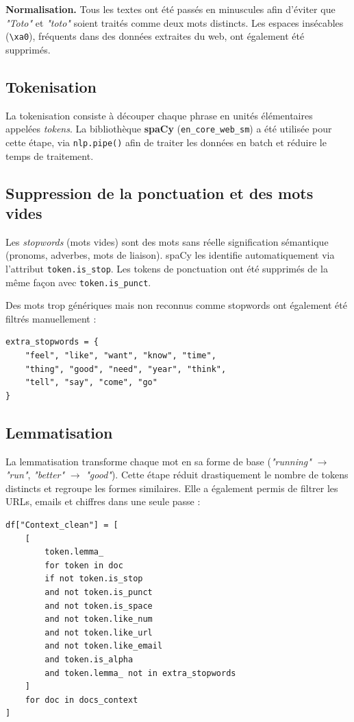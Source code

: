 \documentclass[12pt,a4paper]{article}
\begin{document}
\textbf{Normalisation.}
Tous les textes ont été passés en minuscules afin d'éviter que \textit{"Toto"} et \textit{"toto"}
soient traités comme deux mots distincts. Les espaces insécables (\texttt{\textbackslash xa0}),
fréquents dans des données extraites du web, ont également été supprimés.

\subsection{Tokenisation}

La tokenisation consiste à découper chaque phrase en unités élémentaires appelées
\textit{tokens}. La bibliothèque \textbf{spaCy} (\texttt{en\_core\_web\_sm}) a été utilisée
pour cette étape, via \texttt{nlp.pipe()} afin de traiter les données en batch et réduire le
temps de traitement.

\subsection{Suppression de la ponctuation et des mots vides}
\label{stopwords}

Les \textit{stopwords} (mots vides) sont des mots sans réelle signification sémantique
(pronoms, adverbes, mots de liaison). spaCy les identifie automatiquement via l'attribut
\texttt{token.is\_stop}. Les tokens de ponctuation ont été supprimés de la même façon avec
\texttt{token.is\_punct}.

Des mots trop génériques mais non reconnus comme stopwords ont également été filtrés
manuellement :

\begin{lstlisting}
extra_stopwords = {
    "feel", "like", "want", "know", "time",
    "thing", "good", "need", "year", "think",
    "tell", "say", "come", "go"
}
\end{lstlisting}

\subsection{Lemmatisation}

La lemmatisation transforme chaque mot en sa forme de base (\textit{"running"} $\rightarrow$
\textit{"run"}, \textit{"better"} $\rightarrow$ \textit{"good"}). Cette étape réduit
drastiquement le nombre de tokens distincts et regroupe les formes similaires. Elle a également
permis de filtrer les URLs, emails et chiffres dans une seule passe :

\begin{lstlisting}
df["Context_clean"] = [
    [
        token.lemma_
        for token in doc
        if not token.is_stop
        and not token.is_punct
        and not token.is_space
        and not token.like_num
        and not token.like_url
        and not token.like_email
        and token.is_alpha
        and token.lemma_ not in extra_stopwords
    ]
    for doc in docs_context
]
\end{lstlisting}
\end{document}
